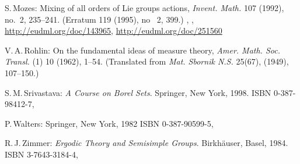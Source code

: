 \begin{references}{99}
S.\,Mozes:
Mixing of all orders of Lie groups actions,
\emph{Invent. Math.} 107 (1992), no.~2, 235--241. 
(Erratum  119 (1995), no~ 2, 399.)
, ,
\maynewline
\url{http://eudml.org/doc/143965}, 
\url{http://eudml.org/doc/251560}

 V.\,A.\,Rohlin:
 On the fundamental ideas of measure theory,
 \emph{Amer. Math. Soc. Transl.} (1) 10 (1962), 1--54.
  (Translated from \emph{Mat. Sbornik N.S.} 25(67), (1949), 107--150.)

S.\,M.\,Srivastava:
\emph{A Course on Borel Sets}.
Springer, New York, 1998. 
ISBN 0-387-98412-7,

 P.\,Walters:
 Springer, New York, 1982
 ISBN 0-387-90599-5,
 

R.\,J.\,Zimmer:
\emph{Ergodic Theory and Semisimple Groups}.
Birkh\"auser, Basel, 1984.
ISBN 3-7643-3184-4,

 \end{references}



